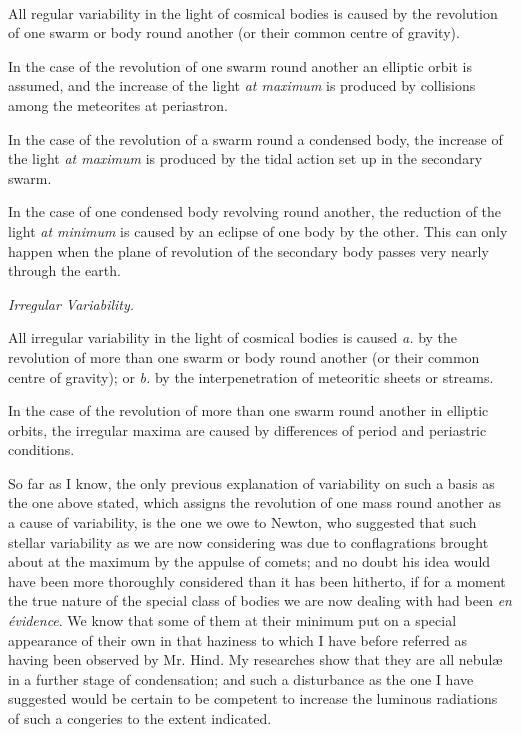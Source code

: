 \documentclass[a4paper, 12pt, oneside, polutonikogreek, english]{article}
\begin{document}
\paragraph{}
All regular variability in the light of cosmical bodies is caused by the revolution of one swarm or body round another (or their common centre of gravity).

In the case of the revolution of one swarm round another an elliptic orbit is assumed, and the increase of the light \emph{at maximum} is produced by collisions among the meteorites at periastron.

In the case of the revolution of a swarm round a condensed body, the increase of the light \emph{at maximum} is produced by the tidal action set up in the secondary swarm.

In the case of one condensed body revolving round another, the reduction of the light \emph{at minimum} is caused by an eclipse of one body by the other. This can only happen when the plane of revolution of the secondary body passes very nearly through the earth.

\emph{Irregular Variability.}

All irregular variability in the light of cosmical bodies is caused \emph{a.} by the revolution of more than one swarm or body round another (or their common centre of gravity); or \emph{b.} by the interpenetration of meteoritic sheets or streams.

In the case of the revolution of more than one swarm round another in elliptic orbits, the irregular maxima are caused by differences of period and periastric conditions.

So far as I know, the only previous explanation of variability on such a basis as the one above stated, which assigns the revolution of one mass round another as a cause of variability, is the one we owe to Newton, who suggested that such stellar variability as we are now considering was due to conflagrations brought about at the maximum by the appulse of comets; and no doubt his idea would have been more thoroughly considered than it has been hitherto, if for a moment the true nature of the special class of bodies we are now dealing with had been \emph{en évidence}. We know that some of them at their minimum put on a special appearance of their own in that haziness to which I have before referred as having been observed by Mr. Hind. My researches show that they are all nebulæ in a further stage of condensation; and such a disturbance as the one I have suggested would be certain to be competent to increase the luminous radiations of such a congeries to the extent indicated.
\end{document}
